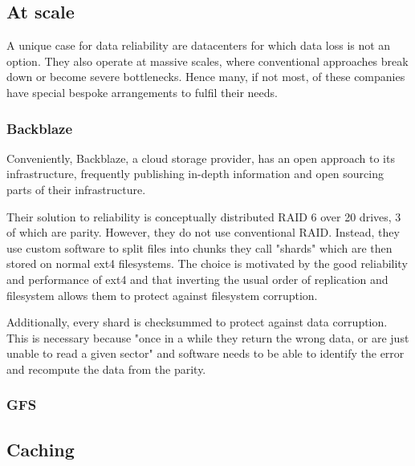         \subsection{At scale}

            A unique case for data reliability are datacenters for which data
            loss is not an option. They also operate at massive scales, where
            conventional approaches break down or become severe bottlenecks.
            Hence many, if not most, of these companies have special bespoke
            arrangements to fulfil their needs.

            \subsubsection{Backblaze}

                Conveniently, Backblaze, a cloud storage provider, has an open
                approach to its infrastructure, frequently publishing in-depth
                information and open sourcing parts of their infrastructure.

                Their solution \cite{Backblaze_arch} to reliability is
                conceptually distributed RAID 6 over 20 drives, 3 of which are
                parity. However, they do not use conventional RAID. Instead,
                they use custom software to split files into chunks they call
                "shards" which are then stored on normal ext4 filesystems. The
                choice is motivated by the good reliability and performance of
                ext4 and that inverting the usual order of replication and
                filesystem allows them to protect against filesystem
                corruption.

                Additionally, every shard is checksummed to protect against
                data corruption. This is necessary because "once in a while
                they return the wrong data, or are just unable to read a given
                sector" \cite{Backblaze_arch} and software needs to be able to
                identify the error and recompute the data from the parity.

            \subsubsection{GFS}

        \subsection{Caching}

